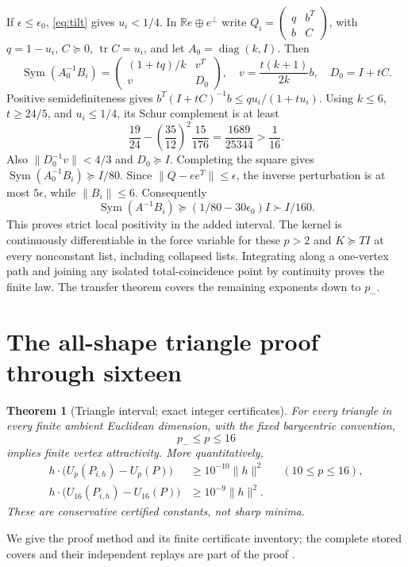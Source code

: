 \documentclass[11pt]{article}
\newtheorem{theorem}{Theorem}[section]
\theoremstyle{definition}
\newcommand{\R}{\mathbb R}
\newcommand{\Sym}{\operatorname{Sym}}
\newcommand{\tr}{\operatorname{tr}}
\newcommand{\diag}{\operatorname{diag}}
\newcommand{\pn}{p_{-}}
\begin{document}
If $\epsilon\le\epsilon_0$, \eqref{eq:tilt} gives $u_i<1/4$. In
$\R e\oplus e^\perp$ write
$Q_i=\begin{pmatrix}q&b^T\\b&C\end{pmatrix}$, with
$q=1-u_i$, $C\succeq0$, $\tr C=u_i$, and let $A_0=\diag(k,I)$.
Then
\[
 \Sym(A_0^{-1}B_i)=
 \begin{pmatrix}(1+tq)/k&v^T\\v&D_0\end{pmatrix},\quad
 v=\frac{t(k+1)}{2k}b,\quad D_0=I+tC.
\]
Positive semidefiniteness gives
$b^T(I+tC)^{-1}b\le qu_i/(1+tu_i)$.
Using $k\le6$, $t\ge24/5$, and $u_i\le1/4$, its Schur complement is at least
\[
 \frac{19}{24}-\left(\frac{35}{12}\right)^2\frac{15}{176}
 =\frac{1689}{25344}>\frac1{16}.
\]
Also $\|D_0^{-1}v\|<4/3$ and $D_0\succeq I$. Completing the square gives
$\Sym(A_0^{-1}B_i)\succeq I/80$.
Since $\|Q-ee^T\|\le\epsilon$, the inverse perturbation is at most
$5\epsilon$, while $\|B_i\|\le6$. Consequently
\[
 \Sym(A^{-1}B_i)\succeq(1/80-30\epsilon_0)I\succ I/160.
\]
This proves strict local positivity in the added interval. The kernel is
continuously differentiable in the force variable for these $p>2$ and
$K\succeq TI$ at every nonconstant list, including collapsed lists.
Integrating along a one-vertex path and joining any isolated total-coincidence
point by continuity proves the finite law. The transfer theorem covers the
remaining exponents down to $\pn$.

\section{The all-shape triangle proof through sixteen}
\begin{theorem}[Triangle interval; exact integer certificates]
\label{thm:triangle}
For every triangle in every finite ambient Euclidean dimension, with the
fixed barycentric convention,
\begin{equation}\label{eq:triangleband}
 \boxed{\pn\le p\le16}
\end{equation}
implies finite vertex attractivity. More quantitatively,
\begin{align}\label{eq:triangleconstants}
 h\cdot\bigl(U_p(P_{i,h})-U_p(P)\bigr)&\ge10^{-10}\|h\|^2
                                  &&(10\le p\le16),\nonumber\\
 h\cdot\bigl(U_{16}(P_{i,h})-U_{16}(P)\bigr)&\ge10^{-9}\|h\|^2.
\end{align}
These are conservative certified constants, not sharp minima.
\end{theorem}
We give the proof method and its finite certificate inventory; the complete
stored covers and their independent replays are part of the proof
\cite{Triangle8,Triangle10,Triangle12,Triangle16}.
\end{document}
